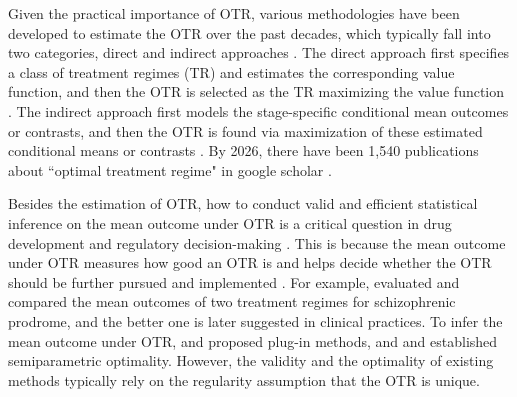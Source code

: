 \documentclass[11pt]{article}
\theoremstyle{referenceplain}
\theoremstyle{referencedefinition}
\theoremstyle{referenceremark}
\begin{document}
Given the practical importance of OTR, various methodologies have been developed to estimate the OTR over the past decades, which typically fall into two categories, direct and indirect approaches \citep{chakraborty2014inference}. The direct approach first specifies a class of treatment regimes (TR) and estimates the corresponding value function, and then the OTR is selected as the TR maximizing the value function \citep{orellana2010dynamic1, orellana2010dynamic2}. The indirect approach first models  the stage-specific conditional mean outcomes or contrasts, and then the OTR is found
via maximization of these estimated conditional means or contrasts \citep{moodie2012q, zhao2012estimating}.  By 2026, there have been 1,540 publications about ``optimal treatment regime" in google scholar \citep{OTRGoogleScholar2026}.

Besides the estimation of OTR, how to conduct valid and efficient statistical inference on the mean outcome under OTR is a critical question in drug development and regulatory decision-making \citep{chakraborty2014dynamic}.   This is because the mean outcome under OTR measures how good an OTR is and helps decide whether the OTR should be further pursued and implemented \citep{wang2012evaluation}.  For example, \citet{lavori2004dynamic}  evaluated and compared the mean outcomes of two treatment regimes for schizophrenic prodrome, and the better one is later suggested in clinical practices. To infer the mean outcome under OTR, \citet{zhang2012robust} and \citet{zhang2013robust} proposed plug-in methods, and \citet{van2014targeted} and \citet{luedtke2016statistical} established semiparametric optimality. However, the validity and the optimality of existing methods typically rely on the regularity assumption that the OTR is unique.

\end{document}
